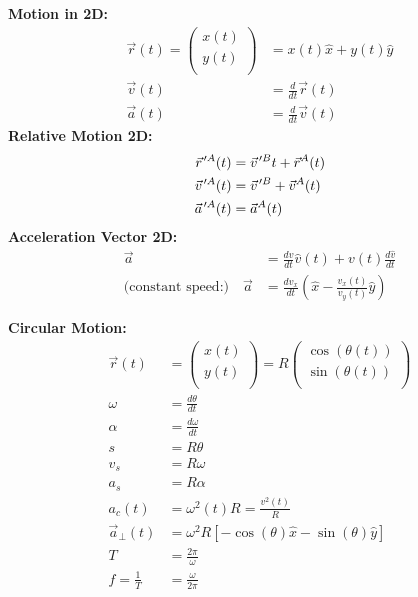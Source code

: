\begin{importantEquations}
\begin{multicols}{2}
\textbf{Motion in 2D:}
\begin{align*}
\vec r(t) = \begin{pmatrix}
          x(t) \\
          y(t) \\
        \end{pmatrix}&= x(t) \hat x + y(t) \hat y\\
\vec v(t) &=\frac{d}{dt}\vec r(t)\\
\vec a(t) &= \frac{d}{dt}\vec v(t)
\end{align*}
\textbf{Relative Motion 2D:}
\begin{align*}
\pvec r'^A(t) &= \pvec v'^Bt+\vec r^A(t)\\
\pvec v'^A(t) &=\pvec v'^B+\vec v^A(t)\\
\pvec a'^A(t)&=\vec a^A(t)
\end{align*}
\textbf{Acceleration Vector 2D:}
\begin{align*}
\vec a&=\frac{dv}{dt}\hat v(t)+v(t)\frac{d\hat v}{dt}\\
\textrm{(constant speed:)} \quad \vec a&=\frac{dv_x}{dt} \left(\hat x - \frac{v_x(t)}{v_y(t)}\hat y\right) 
\end{align*}
\columnbreak

\textbf{Circular Motion:}
\begin{align*}
\vec r(t)&= \begin{pmatrix}
          x(t) \\
          y(t) \\
        \end{pmatrix}
        =R \begin{pmatrix}
          \cos(\theta(t)) \\
          \sin(\theta(t)) \\
        \end{pmatrix}\\
\omega &= \frac{d\theta}{dt}\\
\alpha &= \frac{d\omega}{dt}\\
s&=R\theta\\
v_s&=R\omega\\
a_s&=R\alpha\\
a_c(t) &= \omega^2(t)R = \frac{v^2(t)}{R}\\
\vec a_{\bot}(t)&=\omega^2 R[-\cos(\theta)\hat x-\sin(\theta)\hat y]\\
T&=\frac{2\pi}{\omega}\\
f=\frac{1}{T}&=\frac{\omega}{2\pi}
\end{align*}
\end{multicols}
\end{importantEquations}

